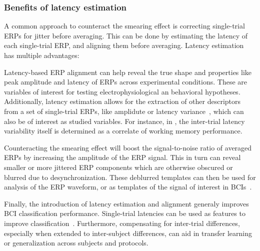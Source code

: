 \subsubsection{Benefits of latency estimation}
A common approach to counteract the smearing effect is correcting single-trial
ERPs for jitter before averaging. This can be done by estimating the latency of each
single-trial ERP, and aligning them before averaging.
Latency estimation has multiple advantages:
\begin{enumerate*}[label={(\arabic*)}]
	\item Latency-based ERP alignment can help reveal the true shape and
	properties like peak amplitude and latency of ERPs across
	experimental conditions. These are variables of interest for
	testing electrophysiological an behavioral hypotheses.
	Additionally, latency estimation allows for the extraction of
	other descriptors from a set of single-trial ERPs, like
	amplidute or latency variance~\cite{Hultsch2004}, which can
	also be of interest as studied variables. For instance, in
	\cite{Saville2014}, the inter-trial latency variability itself
	is determined as a correlate of working memory performance.
	\item Counteracting the smearing effect will boost the signal-to-noise
	ratio of averaged ERPs by increasing the amplitude of the
	ERP signal. This in turn can reveal smaller or more jittered ERP components
	which are otherwise obscured or blurred due to desynchronization.
	These deblurred templates can then be used for analysis of the ERP
	waveform, or as templates of the signal of interest in
	BCIs~\cite{arico2014influence}.
	\item Finally, the introduction of latency estimation and alignment generaly
	improves BCI classification performance. Single-trial latencies can be
	used as features to improve classification~\cite{hardiansyah2020single}.
	Furthermore, compensating for inter-trial differences, especially when
	extended to inter-subject differences, can aid in transfer learning or
	generalization across subjects and protocols\cite{Iturrate2014}.
\end{enumerate*}

